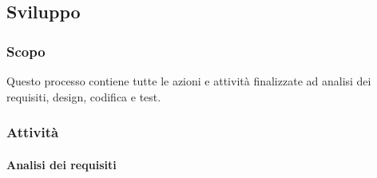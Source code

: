 \subsection{Sviluppo}
\subsubsection{Scopo} Questo processo contiene tutte le azioni e attività finalizzate ad analisi dei requisiti, design, codifica e test.
\subsubsection{Attività}

\paragraph{Analisi dei requisiti}~

